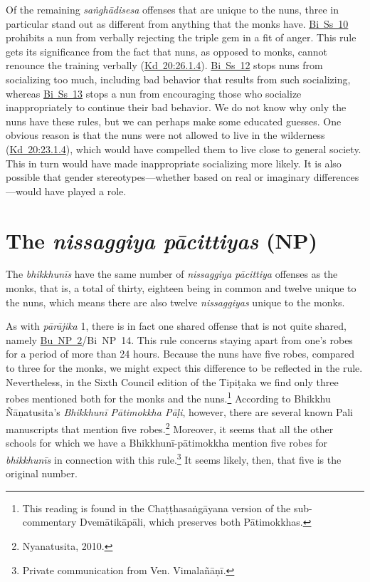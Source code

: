 \documentclass[12pt,openany]{book}%
\begin{document}
Of the remaining \textit{\textsanskrit{saṅghādisesa}} offenses that are unique to the nuns, three in particular stand out as different from anything that the monks have. \href{https://suttacentral.net/pli-tv-bi-vb-ss10/en/brahmali\#1.19.1}{Bi~Ss~10} prohibits a nun from verbally rejecting the triple gem in a fit of anger. This rule gets its significance from the fact that nuns, as opposed to monks, cannot renounce the training verbally (\href{https://suttacentral.net/pli-tv-kd20/en/brahmali\#26.1.4}{Kd~20:26.1.4}). \href{https://suttacentral.net/pli-tv-bi-vb-ss12/en/brahmali\#1.11.1}{Bi~Ss~12} stops nuns from socializing too much, including bad behavior that results from such socializing, whereas \href{https://suttacentral.net/pli-tv-bi-vb-ss13/en/brahmali\#1.23.1}{Bi~Ss~13} stops a nun from encouraging those who socialize inappropriately to continue their bad behavior. We do not know why only the nuns have these rules, but we can perhaps make some educated guesses. One obvious reason is that the nuns were not allowed to live in the wilderness (\href{https://suttacentral.net/pli-tv-kd20/en/brahmali\#23.1.4}{Kd~20:23.1.4}), which would have compelled them to live close to general society. This in turn would have made inappropriate socializing more likely. It is also possible that gender stereotypes—whether based on real or imaginary differences—would have played a role.

\section*{The \textit{nissaggiya \textsanskrit{pācittiyas}} (NP)}

The \textit{\textsanskrit{bhikkhunīs}} have the same number of \textit{nissaggiya \textsanskrit{pācittiya}} offenses as the monks, that is, a total of thirty, eighteen being in common and twelve unique to the nuns, which means there are also twelve \textit{nissaggiyas} unique to the monks.

As with \textit{\textsanskrit{pārājika}} 1, there is in fact one shared offense that is not quite shared, namely \href{https://suttacentral.net/pli-tv-bu-vb-np2/en/brahmali\#2.39.1}{Bu~NP~2}/Bi NP 14. This rule concerns staying apart from one’s robes for a period of more than 24 hours. Because the nuns have five robes, compared to three for the monks, we might expect this difference to be reflected in the rule. Nevertheless, in the Sixth Council edition of the \textsanskrit{Tipiṭaka} we find only three robes mentioned both for the monks and the nuns.\footnote{This reading is found in the \textsanskrit{Chaṭṭhasaṅgāyana} version of the sub-commentary \textsanskrit{Dvemātikāpāli}, which preserves both \textsanskrit{Pātimokkhas}. } According to Bhikkhu \textsanskrit{Ñāṇatusita}’s \textit{\textsanskrit{Bhikkhunī} \textsanskrit{Pātimokkha} \textsanskrit{Pāḷi}}, however, there are several known Pali manuscripts that mention five robes.\footnote{Nyanatusita, 2010. } Moreover, it seems that all the other schools for which we have a \textsanskrit{Bhikkhunī}-\textsanskrit{pātimokkha} mention five robes for \textit{\textsanskrit{bhikkhunīs}} in connection with this rule.\footnote{Private communication from Ven. \textsanskrit{Vimalañāṇī}. } It seems likely, then, that five is the original number.
\end{document}
